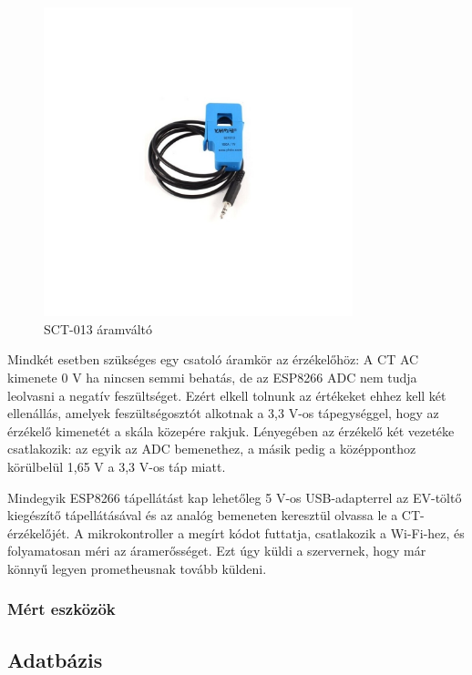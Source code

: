 \begin{figure}[!ht]
    \centering
    \includegraphics[width=0.8\textwidth, keepaspectratio]{figures/CT.jpg}
    \caption{SCT-013 áramváltó \cite{mikroelektronik:sct013}} 
\end{figure}

Mindkét esetben szükséges egy csatoló áramkör az érzékelőhöz: 
A CT AC kimenete 0 V ha nincsen semmi behatás, de az ESP8266 ADC nem tudja leolvasni a negatív feszültséget. 
Ezért elkell tolnunk az értékeket ehhez kell két ellenállás, amelyek feszültségosztót alkotnak 
a 3,3 V-os tápegységgel, hogy az érzékelő kimenetét a skála közepére rakjuk. 
Lényegében az érzékelő két vezetéke csatlakozik: az egyik az ADC bemenethez, 
a másik pedig a középponthoz körülbelül 1,65 V a 3,3 V-os táp miatt.
\cite{openenergymonitor}

Mindegyik ESP8266 tápellátást kap lehetőleg 5 V-os USB-adapterrel az EV-töltő kiegészítő tápellátásával 
és az analóg bemeneten keresztül olvassa le a CT-érzékelőjét.
A mikrokontroller a megírt kódot futtatja, csatlakozik a Wi-Fi-hez, és folyamatosan méri az áramerősséget. 
Ezt úgy küldi a szervernek, hogy már könnyű legyen prometheusnak tovább küldeni.

\subsubsection{Mért eszközök}

\subsection{Adatbázis}

